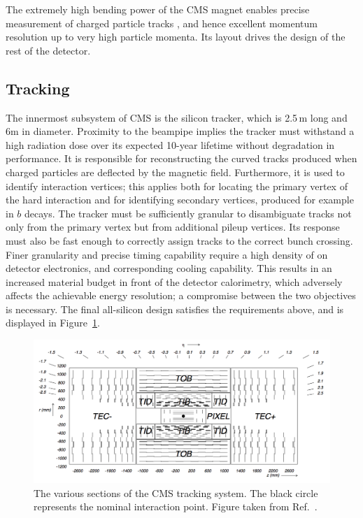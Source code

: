 The extremely high bending power of the CMS magnet enables precise measurement of charged particle tracks , 
and hence excellent momentum resolution up to very high particle momenta.
Its layout drives the design of the rest of the detector.

\subsection{Tracking}

The innermost subsystem of CMS is the silicon tracker, which is 2.5\,m long and 6m in diameter. 
Proximity to the beampipe implies the tracker must withstand a high radiation dose over its expected 10-year lifetime without degradation in performance.
It is responsible for reconstructing the curved tracks produced when charged particles are deflected by the magnetic field. %
Furthermore, it is used to identify interaction vertices; 
this applies both for locating the primary vertex of the hard interaction and for identifying secondary vertices, produced for example in $b$ decays.
The tracker must be sufficiently granular to disambiguate tracks not only from the primary vertex but from additional pileup vertices.
Its response must also be fast enough to correctly assign tracks to the correct bunch crossing.
Finer granularity and precise timing capability require a high density of on detector electronics, and corresponding cooling capability.
This results in an increased material budget in front of the detector calorimetry, which adversely affects the achievable energy resolution; 
a compromise between the two objectives is necessary.
The final all-silicon design satisfies the requirements above, and is displayed in Figure~\ref{fig:detector_tracker}.

\begin{figure}[h!]
  \centering
  \includegraphics[width=\textwidth]{Figures/Detector/TrackerUgly.png}
  \caption[The CMS tracker.]
  {The various sections of the CMS tracking system.
  The black circle represents the nominal interaction point.
  Figure taken from Ref.~\cite{CMSdetector}.}
  \label{fig:detector_tracker}
\end{figure}

